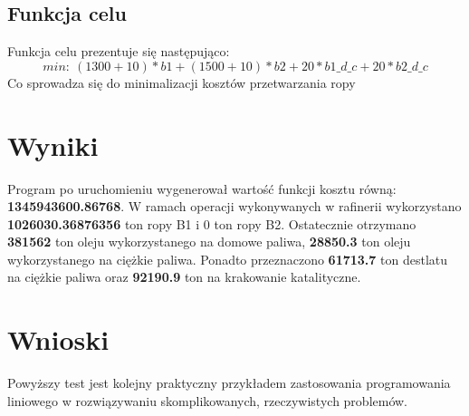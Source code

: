 \documentclass[a4paper,14pt]{report}
\begin{document}
    \subsection{Funkcja celu}
        Funkcja celu prezentuje się następująco:
        \begin{equation}
            min :\ (1300+10) * b1 + (1500+10) * b2 + 20 * b1\_d\_c + 20 * b2\_d\_c
        \end{equation}
        Co sprowadza się do minimalizacji kosztów przetwarzania ropy
\section{Wyniki}
        Program po uruchomieniu wygenerował wartość funkcji kosztu równą: \textbf{1345943600.86768}.
        W ramach operacji wykonywanych w rafinerii wykorzystano \textbf{1026030.36876356} ton ropy B1 i 
        0 ton ropy B2. Ostatecznie otrzymano \textbf{381562} ton oleju wykorzystanego na domowe paliwa, 
        \textbf{28850.3} ton oleju wykorzystanego na ciężkie paliwa. Ponadto przeznaczono \textbf{61713.7} ton 
        destlatu na ciężkie paliwa oraz \textbf{92190.9} ton na krakowanie katalityczne.
\section{Wnioski}
        Powyższy test jest kolejny praktyczny przykładem zastosowania programowania liniowego 
        w rozwiązywaniu skomplikowanych, rzeczywistych problemów.
\end{document}
